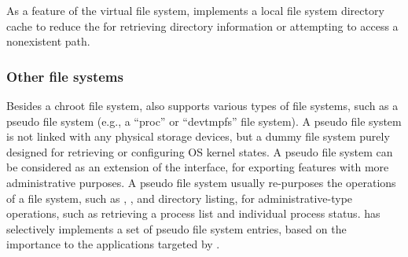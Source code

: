 As a feature of the virtual file system, \thelibos{} implements
a local file system directory cache
to reduce the \hostapis{} for retrieving directory information
or attempting to access a nonexistent path.











\subsubsection{Other file systems}


Besides a chroot file system,
\thelibos{} also supports various types of file systems,
such as a pseudo file system
(e.g., a ``proc'' or ``devtmpfs'' file system).
A pseudo file system is not linked with any physical storage devices,
but a dummy file system
purely designed for retrieving or configuring OS kernel states.
A pseudo file system can be considered as an extension of the \linuxapi{} interface,
for exporting features with more administrative purposes.
A pseudo file system usually re-purposes the operations of a file system, such as , , and directory listing,
for administrative-type operations,
such as retrieving a process list and individual process status.
\thelibos{} has selectively implements a set of pseudo file system entries,
based on the importance to the applications targeted by \graphene{}.



